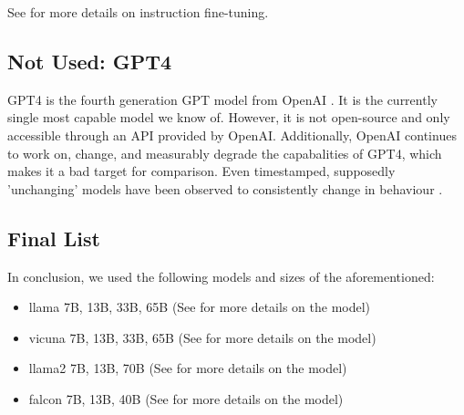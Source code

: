 See  for more details on instruction fine-tuning.

\subsection{Not Used: GPT4}\label{sub:gpt4}
\gls{GPT4} is the fourth generation \gls{GPT} model from \gls{OpenAI} \cite{openai_gpt4_2023}. It is the currently single most capable model we know of.
However, it is not open-source and only accessible through an API provided by \gls{OpenAI}.
Additionally, \gls{OpenAI} continues to work on, change, and measurably degrade the capabalities \cite{chen_how_2023} of \gls{GPT4}, which makes it a bad target for comparison.
Even timestamped, supposedly 'unchanging' models have been observed to consistently change in behaviour \cite{jw1224_hn}.

\subsection{Final List}\label{sub:list}
In conclusion, we used the following models and sizes of the aforementioned:
\begin{itemize}
    \item \gls{llama} 7B, 13B, 33B, 65B (See  for more details on the model)
    \item \gls{vicuna} 7B, 13B, 33B, 65B (See  for more details on the model)
    \item \gls{llama2} 7B, 13B, 70B (See  for more details on the model)
    \item \gls{falcon} 7B, 13B, 40B (See  for more details on the model)
\end{itemize}


